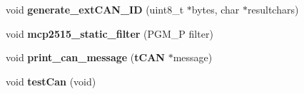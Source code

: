 \begin{DoxyCompactItemize}
\item 
void {\bfseries generate\-\_\-ext\-C\-A\-N\-\_\-\-I\-D} (uint8\-\_\-t $\ast$bytes, char $\ast$resultchars)\label{group__can_ga2a5c69391db363ee151e2e700becc044}

\item 
void {\bfseries mcp2515\-\_\-static\-\_\-filter} (\-P\-G\-M\-\_\-\-P filter)\label{group__can_ga71ab0da5b7baa0e05ab444f76dd776c2}

\item 
void {\bfseries print\-\_\-can\-\_\-message} ({\bf t\-C\-A\-N} $\ast$message)\label{group__can_ga52abe12031912f44f79fe7e6af042d1b}

\item 
void {\bfseries test\-Can} (void)\label{group__can_gaff8c7fc3028fe24b6a3dfc003054d3eb}

\end{DoxyCompactItemize}
